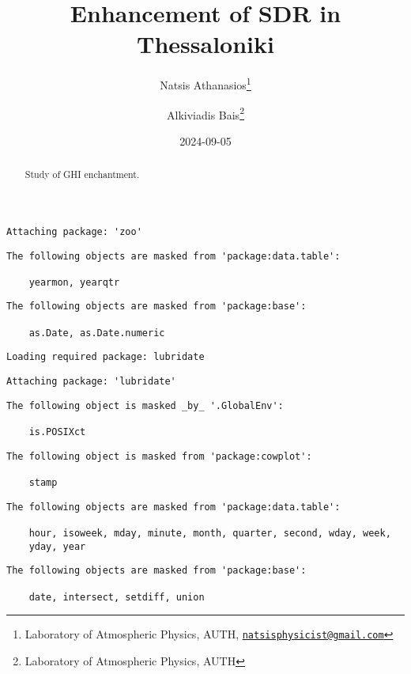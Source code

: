 \documentclass[
  10pt,
  a4paper,oneside]{article}
\title{Enhancement of SDR in Thessaloniki}
\author{Natsis Athanasios\footnote{Laboratory of Atmospheric Physics, AUTH, \href{mailto:natsisphysicist@gmail.com}{\nolinkurl{natsisphysicist@gmail.com}}} \and Alkiviadis Bais\footnote{Laboratory of Atmospheric Physics, AUTH}}
\date{2024-09-05}
\begin{document}
\maketitle
\begin{abstract}
Study of GHI enchantment.
\end{abstract}

{
\hypersetup{linkcolor=}
\setcounter{tocdepth}{4}
\tableofcontents
}
\begin{verbatim}
Attaching package: 'zoo'
\end{verbatim}

\begin{verbatim}
The following objects are masked from 'package:data.table':

    yearmon, yearqtr
\end{verbatim}

\begin{verbatim}
The following objects are masked from 'package:base':

    as.Date, as.Date.numeric
\end{verbatim}

\begin{verbatim}
Loading required package: lubridate
\end{verbatim}

\begin{verbatim}
Attaching package: 'lubridate'
\end{verbatim}

\begin{verbatim}
The following object is masked _by_ '.GlobalEnv':

    is.POSIXct
\end{verbatim}

\begin{verbatim}
The following object is masked from 'package:cowplot':

    stamp
\end{verbatim}

\begin{verbatim}
The following objects are masked from 'package:data.table':

    hour, isoweek, mday, minute, month, quarter, second, wday, week,
    yday, year
\end{verbatim}

\begin{verbatim}
The following objects are masked from 'package:base':

    date, intersect, setdiff, union
\end{verbatim}
\end{document}

